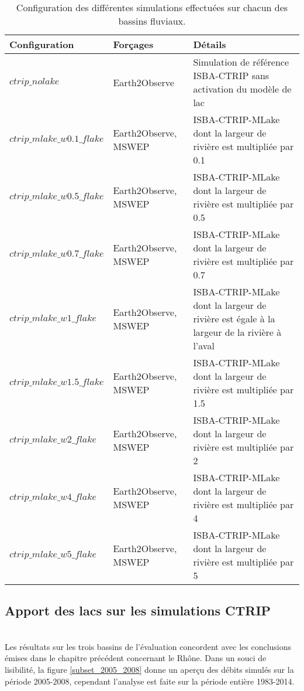 {\renewcommand{\arraystretch}{1.2}
\begin{table}[h!]
 \caption{Configuration des différentes simulations effectuées sur chacun des bassins fluviaux.}
 \label{ctrip_config_globe}
 \begin{tabularx}{\textwidth}{XXX}
 \hline
 Configuration &Forçages &Détails\\
 \hline
  $ctrip\_nolake$&Earth2Observe& \footnotesize{Simulation de référence ISBA-CTRIP sans activation du modèle de lac}\\
    $ctrip\_mlake\_w0.1\_flake$&Earth2Observe, MSWEP&\footnotesize{ISBA-CTRIP-MLake dont la largeur de rivière est multipliée par 0.1}\\
    $ctrip\_mlake\_w0.5\_flake$&Earth2Observe, MSWEP&\footnotesize{ISBA-CTRIP-MLake dont la largeur de rivière est multipliée par 0.5}\\
      $ctrip\_mlake\_w0.7\_flake$&Earth2Observe, MSWEP&\footnotesize{ISBA-CTRIP-MLake dont la largeur de rivière est multipliée par 0.7}\\
  $ctrip\_mlake\_w1\_flake$&Earth2Observe, MSWEP&\footnotesize{ISBA-CTRIP-MLake dont la largeur de rivière est égale à la largeur de la rivière à l'aval}\\
  $ctrip\_mlake\_w1.5\_flake$&Earth2Observe, MSWEP&\footnotesize{ISBA-CTRIP-MLake dont la largeur de rivière est multipliée par 1.5}\\
  $ctrip\_mlake\_w2\_flake$&Earth2Observe, MSWEP&\footnotesize{ISBA-CTRIP-MLake dont la largeur de rivière est multipliée par 2}\\
  $ctrip\_mlake\_w4\_flake$&Earth2Observe, MSWEP&\footnotesize{ISBA-CTRIP-MLake dont la largeur de rivière est multipliée par 4}\\
  $ctrip\_mlake\_w5\_flake$&Earth2Observe, MSWEP&\footnotesize{ISBA-CTRIP-MLake dont la largeur de rivière est multipliée par 5}\\
  \hline
 \end{tabularx}
\end{table}}

\clearpage
\subsection{{\selectfont Apport des lacs sur les simulations CTRIP}}
~\\
Les résultats sur les trois bassins de l'évaluation concordent avec les conclusions émises dans le chapitre précédent concernant le Rhône. Dans un souci de lisibilité, la figure \ref{subset_2005_2008} donne un aperçu des débits simulés sur la période 2005-2008, cependant l'analyse est faite sur la période entière 1983-2014.\\

